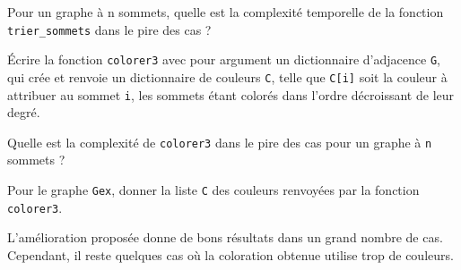 \begin{question}
Pour un graphe à n sommets, quelle est la complexité temporelle de la fonction \lstinline{trier_sommets}
dans le pire des cas ?
\end{question}


\begin{question}
Écrire la fonction \lstinline{colorer3} avec pour argument un dictionnaire d’adjacence \lstinline{G}, qui crée et renvoie un dictionnaire de couleurs \lstinline{C}, telle que \lstinline{C[i]} soit la couleur à attribuer au sommet \lstinline{i}, les sommets étant colorés dans l’ordre décroissant de leur degré.

Quelle est la complexité de \lstinline{colorer3} dans le pire des cas pour un graphe à \lstinline{n} sommets ?
\end{question}


\begin{question}
Pour le graphe \lstinline{Gex}, donner la liste \lstinline{C} des couleurs renvoyées par la fonction
\lstinline{colorer3}.
\end{question}


L’amélioration proposée donne de bons résultats dans un grand nombre de cas. Cependant, il reste
quelques cas où la coloration obtenue utilise trop de couleurs.

